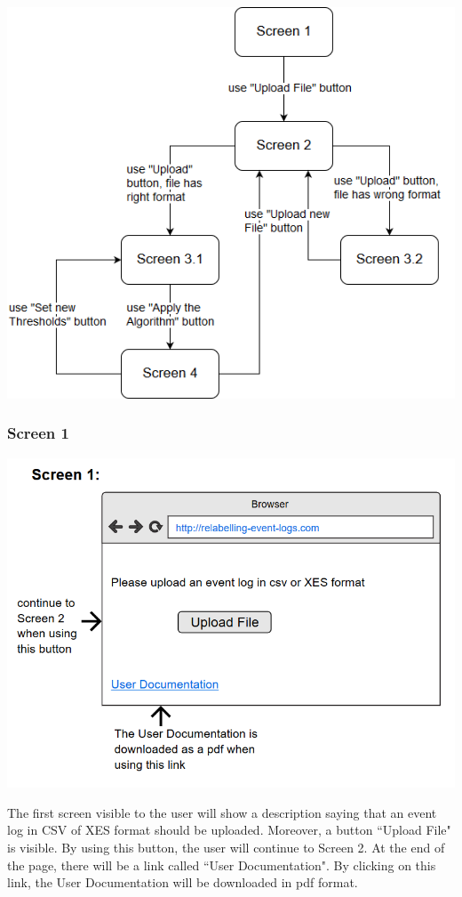 \documentclass[notitlepage]{article}
\begin{document}
\begin{flushleft}
\includegraphics[scale=0.7]{ScreenFlow.png}

\subsubsection{Screen 1}

\includegraphics[scale=0.8]{InterfaceMockup1.png}


The first screen visible to the user will show a description saying that an event log in CSV of XES format should be uploaded. Moreover, a button ``Upload File" is visible. By using this button, the user will continue to Screen 2. At the end of the page, there will be a link called ``User Documentation". By clicking on this link, the User Documentation will be downloaded in pdf format.

\end{flushleft}
\end{document}
